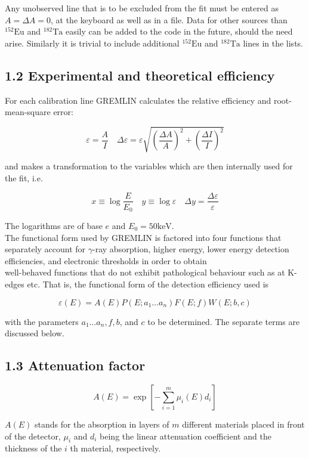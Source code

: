 \documentclass[10pt]{article}
\begin{document}
Any unobserved line that is to be excluded from the fit must be entered as $A=\Delta A=0$, at the keyboard as well as in a file. Data for other sources than ${ }^{152} \mathrm{Eu}$ and ${ }^{182} \mathrm{Ta}$ easily can be added to the code in the future, should the need arise. Similarly it is trivial to include additional ${ }^{152} \mathrm{Eu}$ and ${ }^{182} \mathrm{Ta}$ lines in the lists.

\subsection*{1.2 Experimental and theoretical efficiency}
For each calibration line GREMLIN calculates the relative efficiency and root-mean-square error:

$$
\varepsilon=\frac{A}{I} \quad \Delta \varepsilon=\varepsilon \sqrt{\left(\frac{\Delta A}{A}\right)^{2}+\left(\frac{\Delta I}{I}\right)^{2}}
$$

and makes a transformation to the variables which are then internally used for the fit, i.e.

$$
x \equiv \log \frac{E}{E_{0}} \quad y \equiv \log \varepsilon \quad \Delta y=\frac{\Delta \varepsilon}{\varepsilon}
$$

The logarithms are of base $e$ and $E_{0}=50 \mathrm{keV}$.\\
The functional form used by GREMLIN is factored into four functions that separately account for $\gamma$-ray absorption, higher energy, lower energy detection efficiencies, and electronic thresholds in order to obtain\\
well-behaved functions that do not exhibit pathological behaviour such as at K-edges etc. That is, the functional form of the detection efficiency used is

$$
\varepsilon(E)=A(E) P\left(E ; a_{1} \ldots a_{n}\right) F(E ; f) W(E ; b, c)
$$

with the parameters $a_{1} \ldots a_{n}, f, b$, and $c$ to be determined. The separate terms are discussed below.

\subsection*{1.3 Attenuation factor}
$$
A(E)=\exp \left[-\sum_{i=1}^{m} \mu_{i}(E) d_{i}\right]
$$

$A(E)$ stands for the absorption in layers of $m$ different materials placed in front of the detector, $\mu_{i}$ and $d_{i}$ being the linear attenuation coefficient and the thickness of the $i$ th material, respectively.
\end{document}
